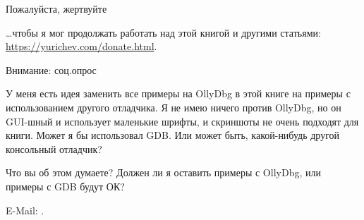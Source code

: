 \vspace*{\fill}

\huge Пожалуйста, жертвуйте
\normalsize

\bigskip
\bigskip
\bigskip

\dots чтобы я мог продолжать работать над этой книгой и другими статьями: \\
\url{https://yurichev.com/donate.html}.

\bigskip
\bigskip
\bigskip

\huge Внимание: соц.опрос
\normalsize

\bigskip
\bigskip
\bigskip

У меня есть идея заменить все примеры на OllyDbg в этой книге на примеры с использованием другого отладчика.
Я не имею ничего против OllyDbg, но он GUI-шный и использует маленькие шрифты, и скриншоты не очень подходят для книги.
Может я бы использовал GDB.
Или может быть, какой-нибудь другой консольный отладчик?

Что вы об этом думаете?
Должен ли я оставить примеры с OllyDbg, или примеры с GDB будут ОК?

E-Mail: \GTT{\EMAIL}.

\vspace*{\fill}
\vfill
